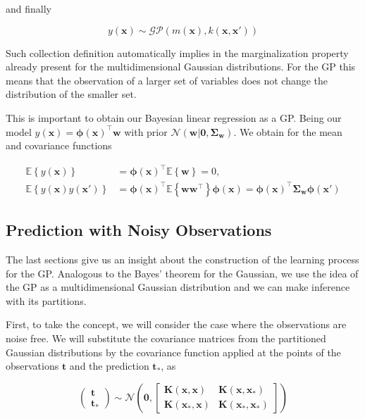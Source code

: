 \documentclass[11pt]{article} %
\begin{document}
and finally

\begin{equation}
   y(\mathbf{x}) \sim \mathcal{GP} \left( m(\mathbf{x}), k(\mathbf{x},\mathbf{x'}) \right)
\end{equation}

Such collection definition automatically implies in the marginalization property already present for the multidimensional Gaussian distributions. For the GP this means that the observation of a larger set of variables does not change the distribution of the smaller set.

This is important to obtain our Bayesian linear regression as a GP. Being our model $y(\mathbf{x})=\boldsymbol{\phi}(\mathbf{x})^\top \mathbf{w}$ with prior $\mathcal{N}\left( \mathbf{w} | \mathbf{0}, \boldsymbol{\Sigma}_{\mathbf{w}}\right)$. We obtain for the mean and covariance functions

\begin{equation}
   \label{eq:gau-pro-mean-cov}
   \begin{aligned}
      \mathbb{E}\left\{ y(\mathbf{x}) \right\} &= \boldsymbol{\phi}(\mathbf{x})^\top \mathbb{E} \left\{ \mathbf{w} \right\} = 0,\\
      \mathbb{E}\left\{ y(\mathbf{x})y(\mathbf{x'}) \right\} &= \boldsymbol{\phi}(\mathbf{x})^\top \mathbb{E} \left\{ \mathbf{ww}^\top \right\}\boldsymbol{\phi}(\mathbf{x}) = \boldsymbol{\phi}(\mathbf{x})^\top \boldsymbol{\Sigma}_{\mathbf{w}} \boldsymbol{\phi}(\mathbf{x'})
   \end{aligned}
\end{equation}

\subsection{Prediction with Noisy Observations}

The last sections give us an insight about the construction of the learning process for the GP. Analogous to the Bayes' theorem for the Gaussian, we use the idea of the GP as a multidimensional Gaussian distribution and we can make inference with its partitions. 

First, to take the concept, we will consider the case where the observations are noise free. We will substitute the covariance matrices from the partitioned Gaussian distributions by the covariance function applied at the points of the observations $\mathbf{t}$ and the prediction $\mathbf{t_*}$, as

\begin{equation}
   \left( \begin{array}{l}{\mathbf{t}}  \\ {\mathbf{t}_*} \end{array} \right) 
   \sim
   \mathcal{N} \left( \mathbf{0}, \left[ \begin{array}{ll}{\mathbf{K}(\mathbf{x},\mathbf{x})} & {\mathbf{K}(\mathbf{x},\mathbf{x_*})} \\ {\mathbf{K}(\mathbf{x_*},\mathbf{x})} & {\mathbf{K}(\mathbf{x_*},\mathbf{x_*})}\end{array} \right] \right)
\end{equation}
\end{document}
